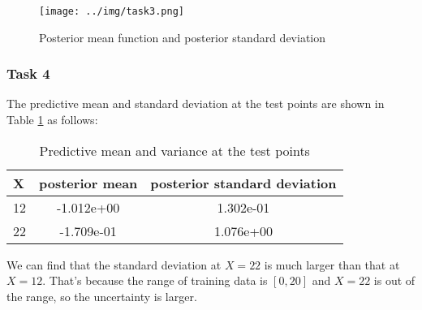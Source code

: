 \begin{figure}[H]
    \centering
    \texttt{[image: ../img/task3.png]}
    \caption{Posterior mean function and posterior standard deviation}
    \label{fig:ex2_1_3}
\end{figure}

\subsubsection{Task 4}

The predictive mean and standard deviation at the test points are shown in Table \ref{tab:ex2_1_4} as follows:

\begin{table}[H]
    \centering
    \begin{tabular}{|l|c|c|}
        \toprule
        X & posterior mean & posterior standard deviation \\
        \midrule
        12 & -1.012e+00 & 1.302e-01 \\
        22 & -1.709e-01 & 1.076e+00 \\
        \bottomrule
    \end{tabular}
    \caption{Predictive mean and variance at the test points}
    \label{tab:ex2_1_4}
\end{table}

We can find that the standard deviation at $X=22$ is much larger than that at $X=12$. That's because the range of training data is $[0, 20]$ and $X=22$ is out of the range, so the uncertainty is larger.